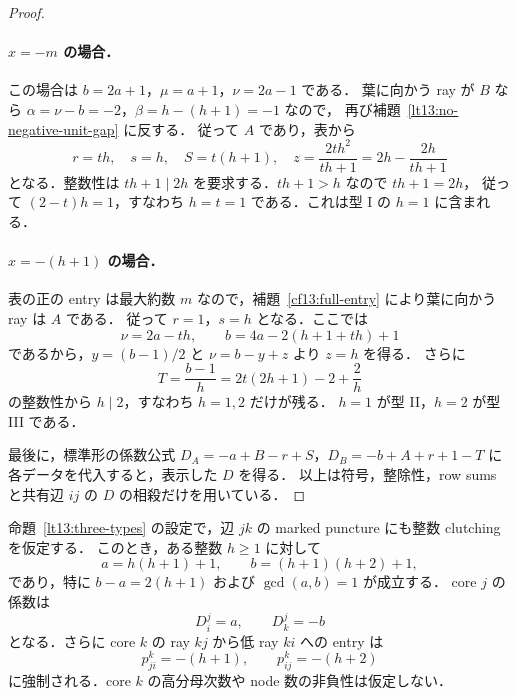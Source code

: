 \begin{proof}
\paragraph{$x=-m$ の場合．}
この場合は $b=2a+1$，$\mu=a+1$，$\nu=2a-1$ である．
葉に向かう ray が $B$ なら $\alpha=\nu-b=-2$，$\beta=h-(h+1)=-1$ なので，
再び補題~\ref{lt13:no-negative-unit-gap} に反する．
従って $A$ であり，表から
\[
 r=t h,\quad s=h,\quad S=t(h+1),\quad
 z=\frac{2t h^2}{t h+1}=2h-\frac{2h}{t h+1}
\]
となる．整数性は $t h+1\mid2h$ を要求する．$t h+1>h$ なので $t h+1=2h$，
従って $(2-t)h=1$，すなわち $h=t=1$ である．これは型 I の $h=1$ に含まれる．

\paragraph{$x=-(h+1)$ の場合．}
表の正の entry は最大約数 $m$ なので，補題~\ref{cf13:full-entry} により葉に向かう ray は $A$ である．
従って $r=1$，$s=h$ となる．ここでは
\[
 \nu=2a-t h,\qquad b=4a-2(h+1+t h)+1
\]
であるから，$y=(b-1)/2$ と $\nu=b-y+z$ より $z=h$ を得る．
さらに
\[
 T=\frac{b-1}{h}=2t(2h+1)-2+\frac2h
\]
の整数性から $h\mid2$，すなわち $h=1,2$ だけが残る．
$h=1$ が型 II，$h=2$ が型 III である．

最後に，標準形の係数公式
$D_A=-a+B-r+S$，$D_B=-b+A+r+1-T$ に各データを代入すると，表示した $D$ を得る．
以上は符号，整除性，row sums と共有辺 $ij$ の $D$ の相殺だけを用いている．
\end{proof}

\begin{theorem}
\label{lt13:exact-transfer}
命題~\ref{lt13:three-types} の設定で，辺 $jk$ の marked puncture にも整数 clutching を仮定する．
このとき，ある整数 $h\geq1$ に対して
\[
 a=h(h+1)+1,\qquad b=(h+1)(h+2)+1,
\]
であり，特に $b-a=2(h+1)$ および $\gcd(a,b)=1$ が成立する．
core $j$ の係数は
\[
 D^j_i=a,\qquad D^j_k=-b
\]
となる．さらに core $k$ の ray $kj$ から低 ray $ki$ への entry は
\[
 p^k_{ji}=-(h+1),\qquad p^k_{ij}=-(h+2)
\]
に強制される．core $k$ の高分母次数や node 数の非負性は仮定しない．
\end{theorem}

